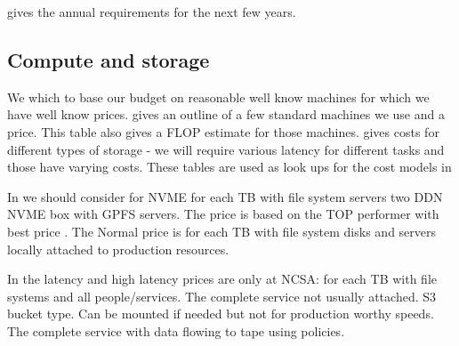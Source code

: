  gives the annual requirements for the next few years.



\subsection{Compute and storage }\label{sec:csmodel}
We which to base our budget on reasonable well know machines for which we have well know prices.
 gives an outline of a few standard machines we use and a price. This table also gives a FLOP estimate
for those machines.
 gives costs for different types of storage - we will require various latency for different tasks
and those have varying costs.
These tables are used as look ups for the cost models in 



In  we should consider for NVME for each TB with file system servers two DDN NVME box with GPFS servers.
The price is based on the TOP performer with best price .
The Normal price is for each TB with file system disks and servers locally attached to production resources.

In the latency and high latency prices are only at NCSA: for each TB with file systems and all people/services.
The complete service not usually attached.   S3 bucket type.
Can be mounted if needed but not for production worthy speeds.
The complete service with data flowing to tape using policies.




